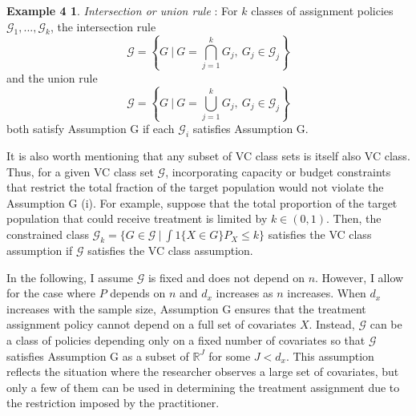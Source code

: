 \documentclass[12pt,oneside,reqno,english]{amsart}
\theoremstyle{definition}
\newtheorem*{ex4}{Example 4}
\begin{document}
\begin{ex4} \textit{Intersection or union rule} \citep{KT:18}:  For $k$ classes of assignment policies $\mathcal{G}_{1},...,\mathcal{G}_{k}$, the intersection rule 
\[\mathcal{G}=\left\{G \ | \ G=\bigcap_{j=1}^{k}G_{j},\ G_{j}\in \mathcal{G}_{j}  \right\}\] 
and the union rule 
\[\mathcal{G}=\left\{G \ | \ G=\bigcup_{j=1}^{k}G_{j},\ G_{j}\in \mathcal{G}_{j} \right\}\] 
both satisfy Assumption G if each $\mathcal{G}_{i}$ satisfies Assumption G. 
\end{ex4} 
It is also worth mentioning that any subset of VC class sets is itself also VC class. 
Thus, for a given VC class set $\mathcal{G}$,
incorporating capacity or budget constraints that restrict the total fraction of the target population would not violate the Assumption G (i).
For example, suppose that the total proportion of the target population that could receive treatment is limited by $k\in (0,1)$.
Then, the constrained class $\mathcal{G}_{k} = \{G\in \mathcal{G}\ | \ \int 1\{X\in G\}P_{X} \leq k\}$ satisfies the VC class assumption 
if $\mathcal{G}$ satisfies the VC class assumption.


In the following, I assume $\mathcal{G}$ is fixed and does not depend on $n$. However, I allow for the case where 
$P$ depends on $n$ and $d_{x}$ increases as $n$ increases. 
When $d_{x}$ increases with the sample size, Assumption G ensures that the treatment assignment policy cannot depend on a full set of covariates $X$. 
Instead, $\mathcal{G}$ can be a class of policies depending only on a fixed number of covariates so that
 $\mathcal{G}$ satisfies Assumption G as a subset of $\mathbb{R}^{J}$ for some $J< d_{x}$. 
This assumption reflects the situation where the researcher observes a large set of covariates, but only a few of them can be used in determining the treatment assignment 
due to the restriction imposed by the practitioner. 
\end{document}
